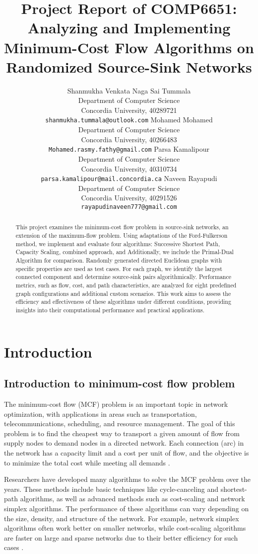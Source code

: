 \documentclass{article}
\title{Project Report of COMP6651: Analyzing and Implementing Minimum-Cost Flow Algorithms on Randomized Source-Sink Networks
}
\author{%
	Shanmukha Venkata Naga Sai Tummala\\
  Department of Computer Science \\
  Concordia University, 40289721 \\
  \texttt{shanmukha.tummala@outlook.com} 
  \And
	Mohamed Mohamed\\
  Department of Computer Science \\
  Concordia University, 40266483 \\
  \texttt{Mohamed.rasmy.fathy@gmail.com} 
  \And
  Parsa Kamalipour\\
  Department of Computer Science \\
  Concordia University, 40310734 \\
  \texttt{parsa.kamalipour@mail.concordia.ca} 
  \And
  Naveen Rayapudi \\
  Department of Computer Science \\
  Concordia University, 40291526 \\
  \texttt{rayapudinaveen777@gmail.com} 
}
\begin{document}
\maketitle

\begin{abstract}
This project examines the minimum-cost flow problem in source-sink networks, an extension of the maximum-flow problem. Using adaptations of the Ford-Fulkerson method, we implement and evaluate four algorithms: Successive Shortest Path, Capacity Scaling, combined approach, and Additionally, we include the Primal-Dual Algorithm for comparison. Randomly generated directed Euclidean graphs with specific properties are used as test cases. For each graph, we identify the largest connected component and determine source-sink pairs algorithmically. Performance metrics, such as flow, cost, and path characteristics, are analyzed for eight predefined graph configurations and additional custom scenarios. This work aims to assess the efficiency and effectiveness of these algorithms under different conditions, providing insights into their computational performance and practical applications.
\end{abstract}

\section{Introduction}
\subsection{Introduction to minimum-cost flow problem}

The minimum-cost flow (MCF) problem is an important topic in network optimization, with applications in areas such as transportation, telecommunications, scheduling, and resource management. The goal of this problem is to find the cheapest way to transport a given amount of flow from supply nodes to demand nodes in a directed network. Each connection (arc) in the network has a capacity limit and a cost per unit of flow, and the objective is to minimize the total cost while meeting all demands \cite{Ahuja1993NetworkFT}.

Researchers have developed many algorithms to solve the MCF problem over the years. These methods include basic techniques like cycle-canceling and shortest-path algorithms, as well as advanced methods such as cost-scaling and network simplex algorithms. The performance of these algorithms can vary depending on the size, density, and structure of the network. For example, network simplex algorithms often work better on smaller networks, while cost-scaling algorithms are faster on large and sparse networks due to their better efficiency for such cases \cite{Sokkalingam2000NewPC}.
\end{document}
